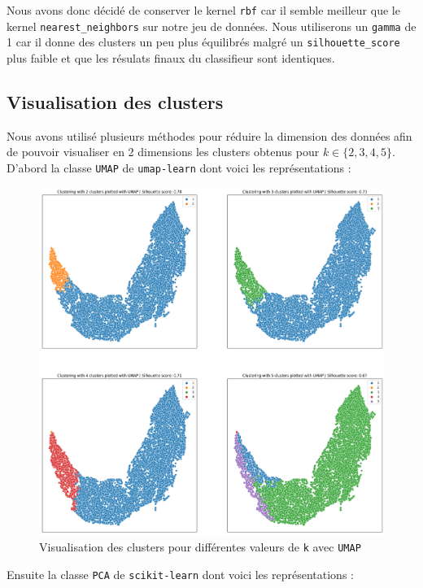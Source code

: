 \documentclass{article}
\begin{document}
Nous avons donc décidé de conserver le kernel \texttt{rbf} car il semble meilleur
que le kernel \texttt{nearest\_neighbors} sur notre jeu de données.
Nous utiliserons un \texttt{gamma} de 1 car il donne des clusters un 
peu plus équilibrés malgré un \texttt{silhouette\_score}
plus faible et que les résulats finaux du classifieur sont identiques.

\newpage
\subsection{Visualisation des clusters}
Nous avons utilisé plusieurs méthodes pour réduire la dimension des données
afin de pouvoir visualiser en 2 dimensions les clusters obtenus pour 
\texttt{$k \in \{2, 3, 4, 5\}$}.
\vskip 0.25cm
D'abord la classe \texttt{UMAP} de \texttt{umap-learn} dont voici les représentations :

\begin{figure}[ht]
  \centering
  \includegraphics[width=1\textwidth]{img/clustering_umap.png}
  \caption{Visualisation des clusters pour différentes valeurs de \texttt{k} avec \texttt{UMAP}}
\end{figure}
\newpage

Ensuite la classe \texttt{PCA} de \texttt{scikit-learn} dont voici les représentations :
\end{document}
